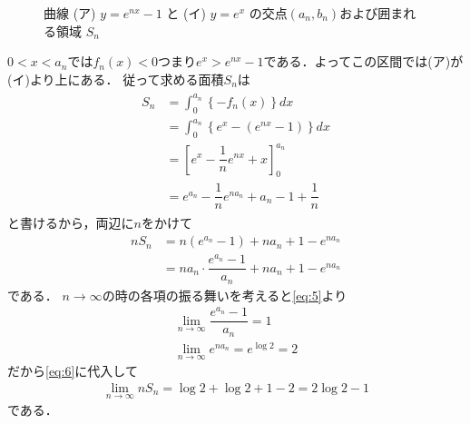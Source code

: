 \documentclass[../../main.tex]{subfiles}
\begin{document}
\begin{figure}[htb]
\begin{center}
  \end{center}
  \caption{曲線 (ア) $y=e^{nx}-1$ と (イ) $y=e^x$ の交点$(a_n,b_n)$および囲まれる領域 $S_n$}
\end{figure}

$0<x<a_n$では$f_n(x)<0$つまり$e^x>e^{nx}-1$である．よってこの区間では(ア)が(イ)より上にある．
従って求める面積$S_n$は
\begin{align}
  \begin{split}
    S_n
    &=\int_0^{a_n}\left\{-f_n(x)\right\}dx\\
    &=\int_0^{a_n}\left\{e^x-(e^{nx}-1)\right\}dx\\
    &=\left[e^x-\dfrac{1}{n}e^{nx}+x\right]_0^{a_n} \\
    &=e^{a_n}-\dfrac{1}{n}e^{na_n}+a_n-1+\dfrac{1}{n}
  \end{split}
\end{align}
と書けるから，両辺に$n$をかけて
\begin{align}
  nS_n
  &=n(e^{a_n}-1)+na_n+1-e^{na_n} \\
  &=na_n\cdot\dfrac{e^{a_n}-1}{a_n}+na_n+1-e^{na_n} \label{eq:6}
\end{align}
である．
$n\to\infty$の時の各項の振る舞いを考えると\cref{eq:5}より
\begin{align}
  \lim_{n\to\infty} \dfrac{e^{a_n}-1}{a_n} = 1 \\
  \lim_{n\to\infty} e^{na_n} = e^{\log 2} = 2
\end{align}
だから\cref{eq:6}に代入して
\begin{align}
  \lim_{n\to\infty} nS_n = \log 2 + \log 2 +1 -2 = 2\log 2-1
\end{align}
である．
\end{document}

